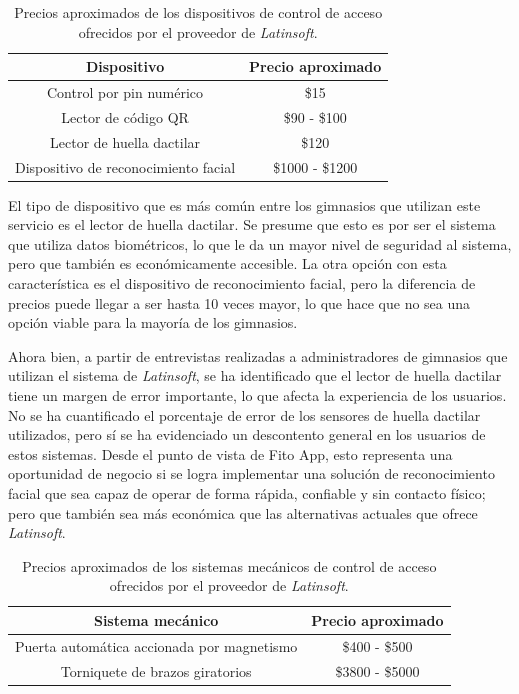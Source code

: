 \begin{table}[h!]
    \centering
    \begin{tabular}{c|c}
    \hline
         \textbf{Dispositivo} & \textbf{Precio aproximado}\\
         \hline
         Control por pin numérico & \$15\\
         Lector de código QR & \$90 - \$100\\
         Lector de huella dactilar & \$120\\
         Dispositivo de reconocimiento facial & \$1000 - \$1200\\
         \hline
    \end{tabular}
    \captionsetup{justification=centering}
    \caption{Precios aproximados de los dispositivos de control de acceso ofrecidos por el proveedor de \textit{Latinsoft}.}
    \label{tab:latinsoft_devices}
\end{table}

El tipo de dispositivo que es más común entre los gimnasios que utilizan este servicio es el lector de huella dactilar. Se presume que esto es por ser el sistema que utiliza datos biométricos, lo que le da un mayor nivel de seguridad al sistema, pero que también es económicamente accesible. La otra opción con esta característica es el dispositivo de reconocimiento facial, pero la diferencia de precios puede llegar a ser hasta 10 veces mayor, lo que hace que no sea una opción viable para la mayoría de los gimnasios.

Ahora bien, a partir de entrevistas realizadas a administradores de gimnasios que utilizan el sistema de \textit{Latinsoft}, se ha identificado que el lector de huella dactilar tiene un margen de error importante, lo que afecta la experiencia de los usuarios. No se ha cuantificado el porcentaje de error de los sensores de huella dactilar utilizados, pero sí se ha evidenciado un descontento general en los usuarios de estos sistemas. Desde el punto de vista de Fito App, esto representa una oportunidad de negocio si se logra implementar una solución de reconocimiento facial que sea capaz de operar de forma rápida, confiable y sin contacto físico; pero que también sea más económica que las alternativas actuales que ofrece \textit{Latinsoft}.

\begin{table}[h!]
    \centering
    \begin{tabular}{c|c}
    \hline
         \textbf{Sistema mecánico} & \textbf{Precio aproximado}\\
         \hline
         Puerta automática accionada por magnetismo & \$400 - \$500\\
         Torniquete de brazos giratorios & \$3800 - \$5000\\
         \hline
    \end{tabular}
    \captionsetup{justification=centering}
    \caption{Precios aproximados de los sistemas mecánicos de control de acceso ofrecidos por el proveedor de \textit{Latinsoft}.}
    \label{tab:latinsoft_mechanical}
\end{table}

